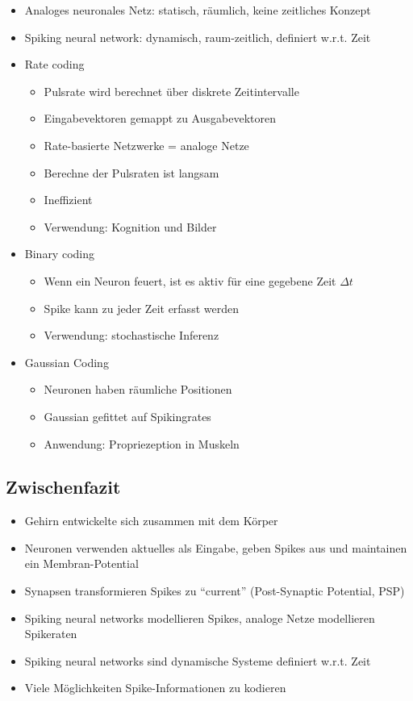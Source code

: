 \documentclass[paper=a4, fontsize=11pt]{scrartcl} %
\numberwithin{equation}{section} %
\numberwithin{figure}{section} %
\numberwithin{table}{section} %
\begin{document}
\begin{itemize}
\item Analoges neuronales Netz: statisch, räumlich, keine zeitliches Konzept
\item Spiking neural network: dynamisch, raum-zeitlich, definiert w.r.t. Zeit
\item Rate coding
\begin{itemize}
\item Pulsrate wird berechnet über diskrete Zeitintervalle
\item Eingabevektoren gemappt zu Ausgabevektoren
\item Rate-basierte Netzwerke = analoge Netze
\item Berechne der Pulsraten ist langsam
\item Ineffizient
\item Verwendung: Kognition und Bilder
\end{itemize}
\item Binary coding
\begin{itemize}
\item Wenn ein Neuron feuert, ist es aktiv für eine gegebene Zeit $\Delta t$
\item Spike kann zu jeder Zeit erfasst werden
\item Verwendung: stochastische Inferenz
\end{itemize}
\item Gaussian Coding
\begin{itemize}
\item Neuronen haben räumliche Positionen
\item Gaussian gefittet auf Spikingrates
\item Anwendung: Propriezeption in Muskeln
\end{itemize}
\end{itemize}

\subsection{Zwischenfazit}

\begin{itemize}
\item Gehirn entwickelte sich zusammen mit dem Körper
\item Neuronen verwenden aktuelles als Eingabe, geben Spikes aus und maintainen ein Membran-Potential
\item Synapsen transformieren Spikes zu ``current'' (Post-Synaptic Potential, PSP)
\item Spiking neural networks modellieren Spikes, analoge Netze modellieren Spikeraten
\item Spiking neural networks sind dynamische Systeme definiert w.r.t. Zeit
\item Viele Möglichkeiten Spike-Informationen zu kodieren
\end{itemize}
\end{document}
